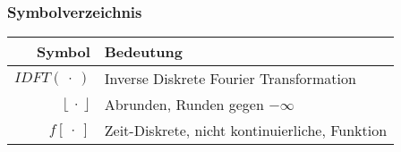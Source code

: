 
\setcounter{page}{1}

\newpage

\thispagestyle{empty}
\clearpage\null
\newpage
\pagestyle{plain}

\setcounter{page}{1}


\newpage

\tableofcontents

\newpage



\subsubsection*{Symbolverzeichnis}

\begin{tabularx}{\linewidth}{r | l}
\textbf{Symbol} & \textbf{Bedeutung} \\
\hline
$\textit{IDFT}\left(\ \cdot\ \right)$ & Inverse Diskrete Fourier Transformation \\
$\lfloor\ \cdot\ \rfloor$ & Abrunden, Runden gegen $-\infty$ \\
$f\left[\ \cdot \ \right]$ & Zeit-Diskrete, nicht kontinuierliche, Funktion
\end{tabularx}

\newpage

\listoffigures

\newpage

\listofequations

\newpage

\printacronyms

\newpage

\printglossary[]


